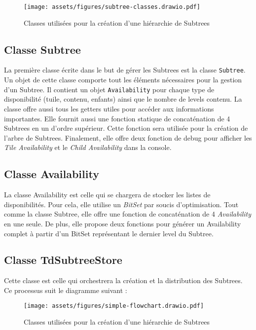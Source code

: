 \begin{figure}[H]
    \centering
    \texttt{[image: assets/figures/subtree-classes.drawio.pdf]}
    \caption{Classes utilisées pour la création d'une hiérarchie de Subtrees}
    \label{fig:subtree-classes}
\end{figure}

\subsection*{Classe Subtree}
\label{sec:subtree-class}

La première classe écrite dans le but de gérer les Subtrees est la classe \texttt{Subtree}. Un objet de cette classe comporte tout les éléments nécessaires pour la gestion d'un Subtree. Il contient un objet \texttt{Availability} pour chaque type de disponibilité (tuile, contenu, enfants) ainsi que le nombre de levels contenu. La classe offre aussi tous les getters utiles pour accéder aux informations importantes. Elle fournit aussi une fonction statique de concaténation de 4 Subtrees en un d'ordre supérieur. Cette fonction sera utilisée pour la création de l'arbre de Subtrees. Finalement, elle offre deux fonction de debug pour afficher les \textit{Tile Availability} et le \textit{Child Availability} dans la console.

\subsection*{Classe Availability}
\label{sec:availability-class}

La classe Availability est celle qui se chargera de stocker les listes de disponibilités. Pour cela, elle utilise un \textit{BitSet} par soucis d'optimisation. Tout comme la classe Subtree, elle offre une fonction de concaténation de 4 \textit{Availability} en une seule. De plus, elle propose deux fonctions pour générer un Availability complet à partir d'un BitSet représentant le dernier level du Subtree.

\subsection*{Classe TdSubtreeStore}
\label{sec:tdsubtreestore-class}

Cette classe est celle qui orchestrera la création et la distribution des Subtrees. Ce processus suit le diagramme suivant :

\begin{figure}[H]
    \centering
    \texttt{[image: assets/figures/simple-flowchart.drawio.pdf]}
    \caption{Classes utilisées pour la création d'une hiérarchie de Subtrees}
    \label{fig:ssimple-flowchart}
\end{figure}

